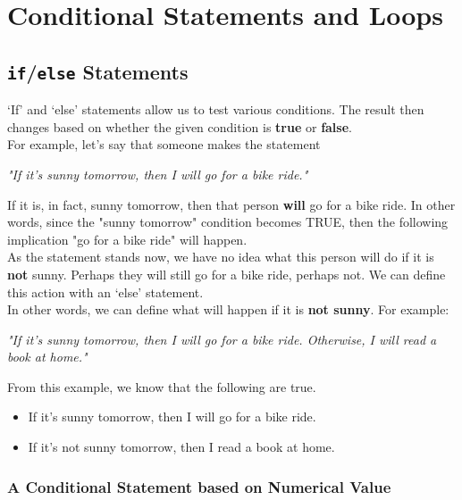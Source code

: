 \chapter{Conditional Statements and Loops}
\label{chp:conditional_statements_and_loops}	

\section{\texttt{if}/\texttt{else} Statements}


`If' and `else' statements allow us to test various conditions. The result then changes based on whether the given condition is \textbf{true} or \textbf{false}.\\

For example, let's say that someone makes the statement\\
\begin{center} \textit{"If it's sunny tomorrow, then I will go for a bike ride."} \end{center}

If it is, in fact, sunny tomorrow, then that person \textbf{will} go for a bike ride. In other words, since the "sunny tomorrow" condition becomes TRUE, then the following implication "go for a bike ride" will happen.\\

As the statement stands now, we have no idea what this person will do if it is \textbf{not} sunny. Perhaps they will still go for a bike ride, perhaps not. We can define this action with an `else' statement.\\

In other words, we can define what will happen if it is \textbf{not sunny}. For example:\\
\begin{center} \textit{"If it's sunny tomorrow, then I will go for a bike ride. Otherwise, I will read a book at home."} \end{center}

\noindent
From this example, we know that the following are true.
\begin{itemize}
	\item If it's sunny tomorrow, then I will go for a bike ride.
	\item If it's not sunny tomorrow, then I read a book at home.
\end{itemize}

\subsection{A Conditional Statement based on Numerical Value}

